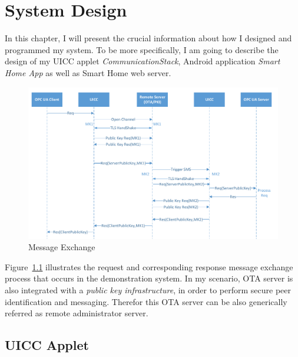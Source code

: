 \chapter{System Design} \label{secDesign}


In this chapter, I will present the crucial information about how I designed and programmed my system. To be more specifically, I am going to describe the design of my UICC applet \emph{CommunicationStack}, Android application \emph{Smart Home App} as well as Smart Home web server.

\begin{figure}[!htbp]
	\centering
	\includegraphics[width=1\textwidth]{whole-structure}
		\caption{Message Exchange}
	\label{fig:whole-structure}
\end{figure}

Figure~\ref{fig:whole-structure} illustrates the request and corresponding response message exchange process that occurs in the demonstration system. In my scenario, OTA server is also integrated with a \emph{public key infrastructure},  in order to perform secure peer identification and messaging. Therefor this OTA server can be also generically referred as remote administrator server.


\section{UICC Applet}
